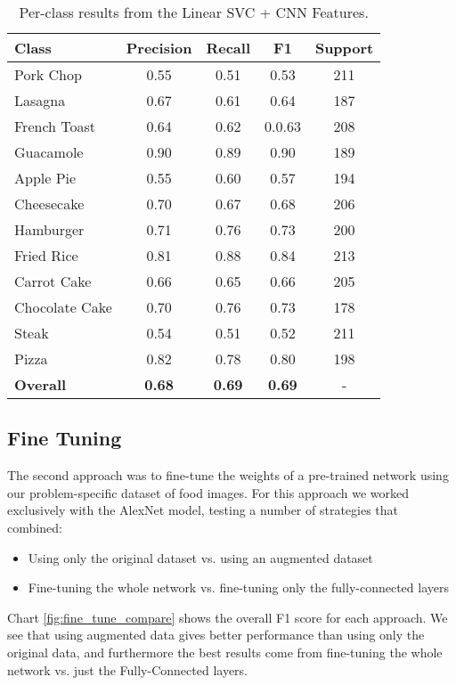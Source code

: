 \documentclass[10pt,a4paper]{article}
\begin{document}
\begin{table}[h]
\small
\setlength\extrarowheight{2pt}
\caption{Per-class results from the Linear SVC + CNN Features.}
\begin{tabular}{p{4cm} c c c c}
\hline
\textbf{Class} & \textbf{Precision} & \textbf{Recall} & \textbf{F1} & \textbf{Support} \\
\hline
Pork Chop & 0.55 & 0.51 & 0.53 & 211\\
Lasagna & 0.67 & 0.61 & 0.64 & 187\\
French Toast & 0.64 & 0.62 & 0.0.63 & 208\\
Guacamole & 0.90 & 0.89 & 0.90 & 189\\
Apple Pie & 0.55 & 0.60 & 0.57 & 194\\
Cheesecake & 0.70 & 0.67 & 0.68 & 206\\
Hamburger & 0.71 & 0.76 & 0.73 & 200\\
Fried Rice & 0.81 & 0.88 & 0.84 & 213\\
Carrot Cake & 0.66 & 0.65 & 0.66 & 205\\
Chocolate Cake & 0.70 & 0.76 & 0.73 & 178\\
Steak & 0.54 & 0.51 & 0.52 & 211\\
Pizza & 0.82 & 0.78 & 0.80 & 198\\
\hline
\hline
\textbf{Overall} & \textbf{0.68} & \textbf{0.69} & \textbf{0.69} & -\\
\hline
\hline
\end{tabular}
\label{table:cnn-feat-results}
\end{table}

\subsection*{Fine Tuning}

The second approach was to fine-tune the weights of a pre-trained network using our problem-specific dataset of food images. For this approach we worked exclusively with the AlexNet model, testing a number of strategies that combined:

\begin{itemize}
\item Using only the original dataset vs. using an augmented dataset
\item Fine-tuning the whole network vs. fine-tuning only the fully-connected layers
\end{itemize}

Chart \ref{fig:fine_tune_compare} shows the overall F1 score for each approach. We see that using augmented data gives better performance than using only the original data, and furthermore the best results come from fine-tuning the whole network vs. just the Fully-Connected layers.
\end{document}
